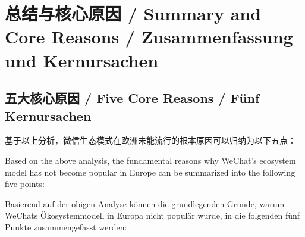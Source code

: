 \documentclass[11pt,a4paper]{article}
\begin{document}
\section{总结与核心原因 / Summary and Core Reasons / Zusammenfassung und Kernursachen}

\subsection{五大核心原因 / Five Core Reasons / Fünf Kernursachen}

基于以上分析，微信生态模式在欧洲未能流行的根本原因可以归纳为以下五点：

Based on the above analysis, the fundamental reasons why WeChat's ecosystem model has not become popular in Europe can be summarized into the following five points:

Basierend auf der obigen Analyse können die grundlegenden Gründe, warum WeChats Ökosystemmodell in Europa nicht populär wurde, in die folgenden fünf Punkte zusammengefasst werden:
\end{document}
